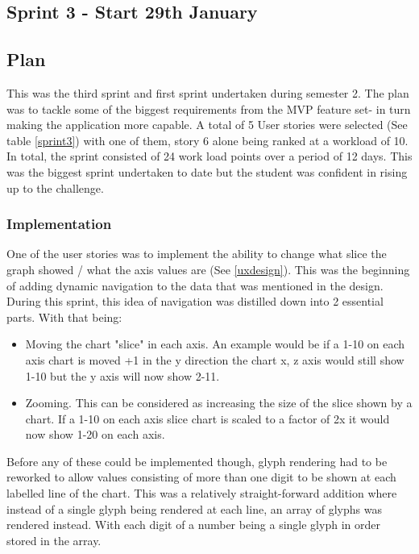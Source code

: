 \subsection{Sprint 3 - Start 29th January} \label{spr3}
\subsection{Plan}
This was the third sprint and first sprint undertaken during semester 2. The plan was to tackle some of the biggest requirements from the MVP feature set- in turn making the application more capable. A total of 5 User stories were selected (See table \ref{sprint3}) with one of them, story 6 alone being ranked at a workload of 10. In total, the sprint consisted of 24 work load points over a period of 12 days. This was the biggest sprint undertaken to date but the student was confident in rising up to the challenge.

\subsubsection{Implementation}

One of the user stories was to implement the ability to change what slice the graph showed / what the axis values are (See \ref{uxdesign}). This was the beginning of adding dynamic navigation to the data that was mentioned in the design. During this sprint, this idea of navigation was distilled down into 2 essential parts. With that being:
\begin{itemize}
    \item Moving the chart "slice" in each axis. An example would be if a 1-10 on each axis chart is moved +1 in the y direction the chart x, z axis would still show 1-10 but the y axis will now show 2-11.
    \item Zooming. This can be considered as increasing the size of the slice shown by a chart. If a 1-10 on each axis slice chart is scaled to a factor of 2x it would now show 1-20 on each axis.
\end{itemize}

Before any of these could be implemented though, glyph rendering had to be reworked to allow values consisting of more than one digit to be shown at each labelled line of the chart. This was a relatively straight-forward addition where instead of a single glyph being rendered at each line, an array of glyphs was rendered instead. With each digit of a number being a single glyph in order stored in the array.

